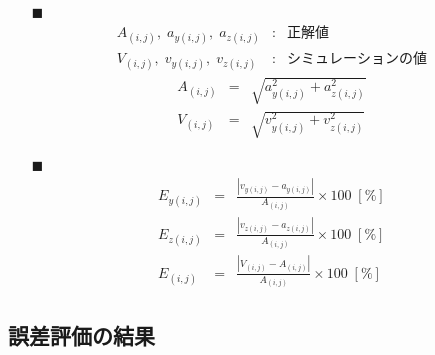 \documentclass[twocolumn,a4j]{jsarticle}
\begin{document}
\begin{itemize}
  \item [$\blacksquare$]
        \begin{eqnarray*}
          A_{(i,j)},\;a_{y(i,j)},\;a_{z(i,j)} &:& 正解値\\
          V_{(i,j)},\;v_{y(i,j)},\;v_{z(i,j)} &:& シミュレーションの値
        \end{eqnarray*}
        \begin{eqnarray*}
          A_{(i,j)} &=& \sqrt{{a_{y(i,j)}^2} + a_{z(i,j)}^2}\\
          V_{(i,j)} &=& \sqrt{{v_{y(i,j)}^2} + v_{z(i,j)}^2}
        \end{eqnarray*}
        \item[$\blacksquare$]
        \begin{eqnarray*}
          E_{y(i,j)} &=& \frac{\left| v_{y(i,j)} - a_{y(i,j)} \right|}{A_{(i,j)}} \times 100 \; [\%]\\
          E_{z(i,j)} &=& \frac{\left| v_{z(i,j)} - a_{z(i,j)} \right|}{A_{(i,j)}} \times 100 \; [\%]\\
          E_{(i,j)} &=& \frac{\left| V_{(i,j)} - A_{(i,j)} \right|}{A_{(i,j)}} \times 100 \; [\%]
        \end{eqnarray*}
\end{itemize}

\newpage

\subsection{誤差評価の結果}
\end{document}
